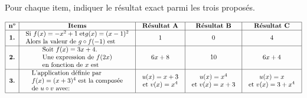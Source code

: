 \begin{exercice}
Pour chaque item, indiquer le  résultat exact parmi les trois proposés.

\medskip

$$\begin{array}{|c|c|c|c|c|}
\hline
\textbf{n°} & \textbf{Items} & \textbf{Résultat A} & \textbf{Résultat B} & \textbf{Résultat C} \\
\hline
\textbf{1.} & \begin{array}{l} \text{Si } f(x) = -x^{2} + 1\; \text{et} g(x)=(x-1)^{2}  \\ \text{Alors la valeur de  } g\circ f(-1)  \text{ est } \end{array} & 1 & 0 & 4 \\
\hline
\textbf{2.} & \begin{array}{l} \text{Soit } f(x) = 3x + 4. \\ \text{Une expression de } f(2x) \\ \text{en fonction de } x \text{ est} \end{array} & 6x+8 & 10 & 6x+4 \\
\hline
\textbf{3.} & \begin{array}{l} \text{L'application définie par } \\ f(x)=(x+3)^4 \text{ est la composée} \\ \text{de } u \circ v \text{ avec:} \end{array} & \begin{array}{c} u(x)= x+3 \\ \text{et } v(x)=x^4 \end{array} & \begin{array}{c} u(x)= x^4 \\ \text{et } v(x)= x+3 \end{array} & \begin{array}{c} u(x)= x \\ \text{et } v(x)=3+x^4 \end{array} \\
\hline
\end{array}$$

\end{exercice}


